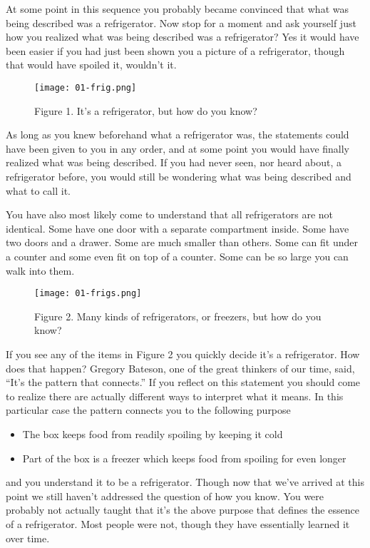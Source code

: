 \documentclass[]{memoir}
\let\Oldincludegraphics\includegraphics
\renewcommand{\includegraphics}[1]{\Oldincludegraphics[max size={\textwidth}{\textheight}]{#1}}
\begin{document}
At some point in this sequence you probably became convinced that what
was being described was a refrigerator. Now stop for a moment and ask
yourself just how you realized what was being described was a
refrigerator? Yes it would have been easier if you had just been shown
you a picture of a refrigerator, though that would have spoiled it,
wouldn't it.

\begin{figure}[htbp]
\centering
\texttt{[image: 01-frig.png]}
\caption{Figure 1. It's a refrigerator, but how do you know?}
\end{figure}

As long as you knew beforehand what a refrigerator was, the statements
could have been given to you in any order, and at some point you would
have finally realized what was being described. If you had never seen,
nor heard about, a refrigerator before, you would still be wondering
what was being described and what to call it.

You have also most likely come to understand that all refrigerators are
not identical. Some have one door with a separate compartment inside.
Some have two doors and a drawer. Some are much smaller than others.
Some can fit under a counter and some even fit on top of a counter. Some
can be so large you can walk into them.

\begin{figure}[htbp]
\centering
\texttt{[image: 01-frigs.png]}
\caption{Figure 2. Many kinds of refrigerators, or freezers, but how do
you know?}
\end{figure}

If you see any of the items in Figure 2 you quickly decide it's a
refrigerator. How does that happen? Gregory Bateson, one of the great
thinkers of our time, said, ``It's the pattern that connects.'' If you
reflect on this statement you should come to realize there are actually
different ways to interpret what it means. In this particular case the
pattern connects you to the following purpose

\begin{itemize}
\itemsep1pt\parskip0pt
\item
  The box keeps food from readily spoiling by keeping it cold
\item
  Part of the box is a freezer which keeps food from spoiling for even
  longer
\end{itemize}

and you understand it to be a refrigerator. Though now that we've
arrived at this point we still haven't addressed the question of how you
know. You were probably not actually taught that it's the above purpose
that defines the essence of a refrigerator. Most people were not, though
they have essentially learned it over time.
\end{document}
